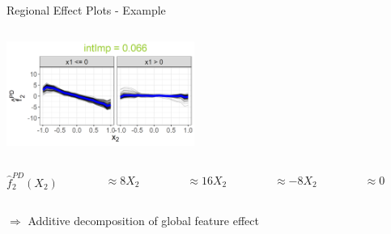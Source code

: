 \documentclass[11pt,compress,t,notes=noshow, aspectratio=169, xcolor=table]{beamer}
\begin{document}
\begin{frame}{Regional Effect Plots - Example}
\begin{columns}[T, totalwidth = \linewidth]
\begin{column}{0.55\textwidth}
{{    \includegraphics[width=0.46\textwidth, trim = 40 0 0 25, clip]{figure/sim1_dt_split2_2.png}
    }

     \begin{columns}[T, totalwidth = \linewidth]
            \begin{column}{0.1\linewidth}
            \centering
             $\hat{f}_2^{PD}(X_2)$ %
         \end{column}
         \begin{column}{0.18\linewidth}
         \centering
             $\approx 8X_2$ %
         \end{column}
        \begin{column}{0.2\linewidth}
\centering
            $\approx 16X_2$ %
         \end{column}
        \begin{column}{0.2\linewidth}
        \centering
            $ \approx -8X_2$ %
         \end{column}        
         \begin{column}{0.2\linewidth}
         \centering
             $\approx 0$%
         \end{column}
     \end{columns}
     \medskip
     $\Rightarrow$ Additive decomposition of global feature effect
}


    \end{column}


\end{columns}
\end{frame}
\end{document}
